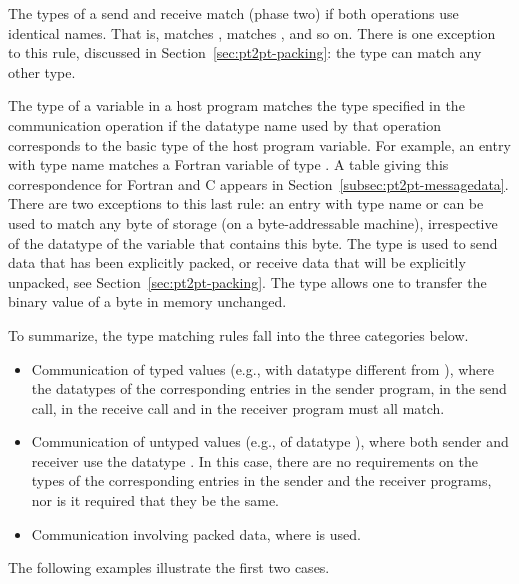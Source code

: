 The types of a send and receive match (phase two) if
both operations use identical names. That is, 
matches ,  matches ,
and so on.
There is one exception to this rule, discussed in
Section~\ref{sec:pt2pt-packing}: the type  can match
any other type.

The type of a variable in a host program matches the type specified in the
communication operation
if the datatype name used by that operation corresponds
to the basic type of the host program variable.  For example, an entry with type
name  matches a Fortran variable of type .
A table giving this correspondence for Fortran and C appears in
Section~\ref{subsec:pt2pt-messagedata}.
There are two exceptions to this last rule: an entry with type name
 or  can be used to match
any byte of storage (on a byte-addressable machine),
irrespective of the datatype of the variable that contains this byte.
The type  is used to send data that has been
explicitly packed, or receive data that will be explicitly unpacked,
see Section~\ref{sec:pt2pt-packing}.
The type  allows one to transfer the binary value of a byte in
memory unchanged.

To summarize, the type matching rules fall into the three categories below.
\begin{itemize}
\item
Communication of typed values (e.g., with datatype different from
),
where the datatypes of the corresponding entries in the sender
program, in the send call,
in the receive call and in the receiver program
must all match.
\item
Communication of untyped values (e.g., of datatype ), where
both sender and receiver use the
datatype .  In this case, there are no
requirements on the types of the corresponding entries in the sender and the
receiver programs, nor is it required that they be the same.
\item
Communication involving packed data, where  is used.
\end{itemize}


The following examples illustrate the first two cases.
\label{page:pt2pt-3examples}

